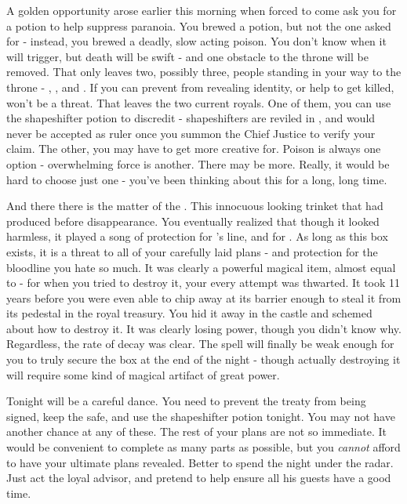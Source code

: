 \documentclass[char]{NeptuneBall}
\begin{document}
A golden opportunity arose earlier this morning when \cKing{} forced \cPlant{} to come ask you for a potion to help suppress paranoia. You brewed a potion, but not the one \cPlant{\they} asked for - instead, you brewed a deadly, slow acting poison. You don't know when it will trigger, but death will be swift - and one obstacle to the throne will be removed. That only leaves two, possibly three, people standing in your way to the throne - \cKing{}, \cPrincess{}, and \cQueen{}. If you can prevent \cQueen{} from revealing \cQueen{\their} identity, or help to get \cQueen{\them} killed, \cQueen{\they} won't be a threat. That leaves the two current royals. One of them, you can use the shapeshifter potion to discredit - shapeshifters are reviled in \pAtlantis{}, and would never be accepted as ruler once you summon the Chief Justice to verify your claim. The other, you may have to get more creative for. Poison is always one option - overwhelming force is another. There may be more. Really, it would be hard to choose just one - you've been thinking about this for a long, long time.

And there there is the matter of the \iMusicBox{\MYname}. This innocuous looking trinket that \cQueen{} had produced before \cQueen{\their} disappearance. You eventually realized that though it looked harmless, it played a song of protection for \cExExKing{}'s line, and for \pAtlantis{}. As long as this box exists, it is a threat to all of your carefully laid plans - and protection for the bloodline you hate so much. It was clearly a powerful magical item, almost equal to \iTrident{\MYname} - for when you tried to destroy it, your every attempt was thwarted. It took 11 years before you were even able to chip away at its barrier enough to steal it from its pedestal in the royal treasury. You hid it away in the castle and schemed about how to destroy it. It was clearly losing power, though you didn't know why. Regardless, the rate of decay was clear. The spell will finally be weak enough for you to truly secure the box at the end of the night - though actually destroying it will require some kind of magical artifact of great power.

Tonight will be a careful dance. You need to prevent the treaty from being signed, keep the \iMusicBox{} safe, and use the shapeshifter potion tonight. You may not have another chance at any of these. The rest of your plans are not so immediate. It would be convenient to complete as many parts as possible, but you \emph{cannot} afford to have your ultimate plans revealed. Better to spend the night under the radar. Just act the loyal advisor, and pretend to help \cKing{} ensure all his guests have a good time.
\end{document}
